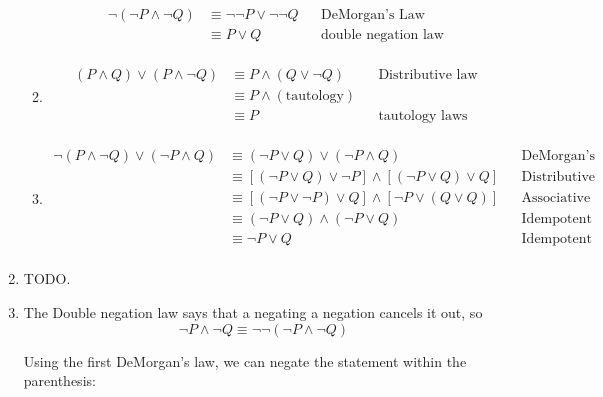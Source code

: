 \documentclass{article}
\begin{document}
\begin{enumerate}
\begin{enumerate}
    \begin{equation*}
      \begin{aligned}
	\lnot (\lnot P \land \lnot Q) & \equiv \lnot \lnot P \lor \lnot \lnot Q && \text{DeMorgan's Law} \\
	& \equiv P \lor Q && \text{double negation law} \\
	\end{aligned}
    \end{equation*}

  \item
    \begin{equation*}
      \begin{aligned}
	(P \land Q) \lor (P \land \lnot Q) & \equiv P \land (Q \lor \lnot Q) && \text{Distributive law} \\
	& \equiv P \land (\text{tautology}) \\
	& \equiv P && \text{tautology laws} \\
	\end{aligned}
    \end{equation*}

  \item
    \begin{equation*}
      \begin{aligned}
	\lnot (P \land \lnot Q) \lor (\lnot P \land Q) & \equiv (\lnot P \lor Q) \lor (\lnot P \land Q) && \text{DeMorgan's law} \\
	& \equiv [(\lnot P \lor Q) \lor \lnot P] \land [(\lnot P \lor Q) \lor Q] && \text{Distributive law} \\
	& \equiv [(\lnot P \lor \lnot P) \lor Q] \land [\lnot P \lor (Q \lor Q)] && \text{Associative law and Commutative law} \\
	& \equiv (\lnot P \lor Q) \land (\lnot P \lor Q) && \text{Idempotent laws} \\
	& \equiv \lnot P \lor Q && \text{Idempotent laws} \\
	\end{aligned}
    \end{equation*}
  \end{enumerate}
\item
  TODO.
\item
  The Double negation law says that a negating a negation cancels it out, so
  \begin{equation*}
    \lnot P \land \lnot Q \equiv \lnot \lnot (\lnot P \land \lnot Q)
  \end{equation*}

  Using the first DeMorgan's law, we can negate the statement within the parenthesis:


\end{enumerate}
\end{document}
